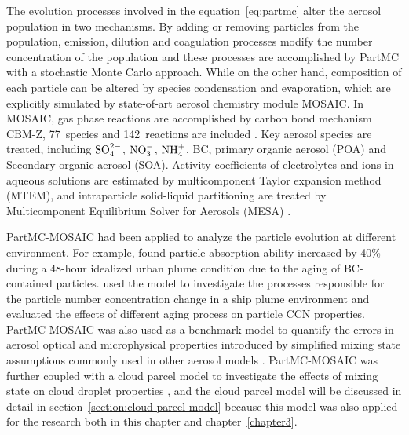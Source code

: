 \documentclass[edeposit,fullpage]{uiucthesis2009}
\begin{document}
The evolution processes involved in the equation~\ref{eq:partmc} alter the aerosol population in two mechanisms. By adding or removing particles from the population, emission, dilution and coagulation processes modify the number concentration of the population and these processes are accomplished by PartMC with a stochastic Monte Carlo approach. While on the other hand, composition of each particle can be altered by species condensation and evaporation, which are explicitly simulated by state-of-art aerosol chemistry module MOSAIC. In MOSAIC, gas phase reactions are accomplished by carbon bond mechanism CBM-Z, 77~species and 142~reactions are included \citep{Zaveri1999}. Key aerosol species are treated, including $\rm SO_4^{2-}$, $\rm NO_3^-$, $\rm NH_4^+$, BC, primary organic aerosol (POA) and Secondary organic aerosol (SOA). Activity coefficients of electrolytes and ions in aqueous solutions are estimated by multicomponent Taylor expansion method (MTEM), and intraparticle solid-liquid partitioning are treated by Multicomponent Equilibrium Solver for Aerosols (MESA) \citep{zaveri2005computationally}.

PartMC-MOSAIC had been applied to analyze the particle evolution at different environment. For example, \citet{Zaveri2010a} found particle absorption ability increased by 40\% during a 48-hour idealized urban plume condition due to the aging of BC-contained particles. \citet{tian2014modeling} used the model to investigate the processes responsible for the particle number concentration change in a ship plume environment and evaluated the effects of different aging process on particle CCN properties. PartMC-MOSAIC was also used as a benchmark model to quantify the errors in aerosol optical and microphysical properties introduced by simplified mixing state assumptions commonly used in other aerosol models \citep{Zaveri2010a, ching2012impacts, Fierce2017}. PartMC-MOSAIC was further coupled with a cloud parcel model to investigate the effects of mixing state on cloud droplet properties \citep{ching2012impacts, Ching2016}, and the cloud parcel model will be discussed in detail in section~\ref{section:cloud-parcel-model} because this model was also applied for the research both in  this chapter and chapter~\ref{chapter3}. 
\end{document}
